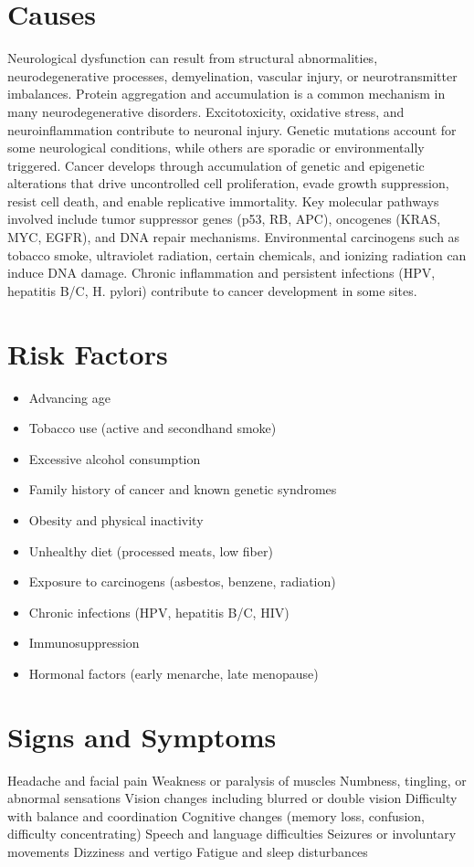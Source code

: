 \section{Causes}
Neurological dysfunction can result from structural abnormalities, neurodegenerative processes, demyelination, vascular injury, or neurotransmitter imbalances. Protein aggregation and accumulation is a common mechanism in many neurodegenerative disorders. Excitotoxicity, oxidative stress, and neuroinflammation contribute to neuronal injury. Genetic mutations account for some neurological conditions, while others are sporadic or environmentally triggered. Cancer develops through accumulation of genetic and epigenetic alterations that drive uncontrolled cell proliferation, evade growth suppression, resist cell death, and enable replicative immortality. Key molecular pathways involved include tumor suppressor genes (p53, RB, APC), oncogenes (KRAS, MYC, EGFR), and DNA repair mechanisms. Environmental carcinogens such as tobacco smoke, ultraviolet radiation, certain chemicals, and ionizing radiation can induce DNA damage. Chronic inflammation and persistent infections (HPV, hepatitis B/C, H. pylori) contribute to cancer development in some sites.
\section{Risk Factors}
\begin{itemize}[noitemsep]
  \item Advancing age
  \item Tobacco use (active and secondhand smoke)
  \item Excessive alcohol consumption
  \item Family history of cancer and known genetic syndromes
  \item Obesity and physical inactivity
  \item Unhealthy diet (processed meats, low fiber)
  \item Exposure to carcinogens (asbestos, benzene, radiation)
  \item Chronic infections (HPV, hepatitis B/C, HIV)
  \item Immunosuppression
  \item Hormonal factors (early menarche, late menopause)
\end{itemize}
\section{Signs and Symptoms}
Headache and facial pain Weakness or paralysis of muscles Numbness, tingling, or abnormal sensations Vision changes including blurred or double vision Difficulty with balance and coordination Cognitive changes (memory loss, confusion, difficulty concentrating) Speech and language difficulties Seizures or involuntary movements Dizziness and vertigo Fatigue and sleep disturbances

